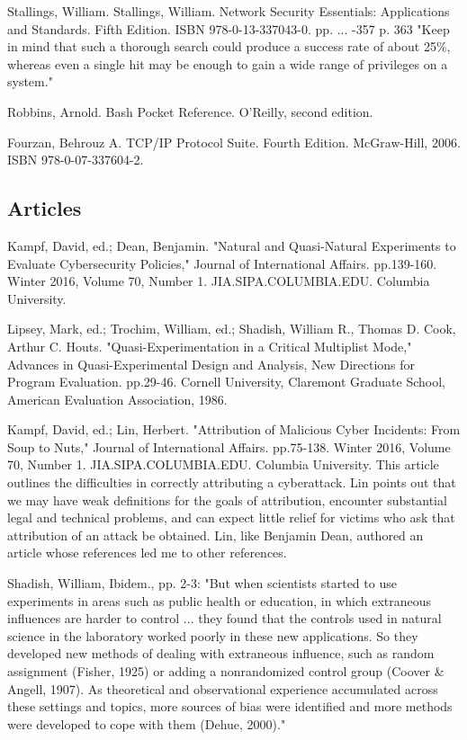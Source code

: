 Stallings, William. Stallings, William. Network Security Essentials: Applications and Standards. Fifth Edition. ISBN 978-0-13-337043-0. pp. ... -357 p. 363 "Keep in mind that such a thorough search could produce a success rate of about 25\%, whereas even a single hit may be enough to gain a wide range of privileges on a system."

Robbins, Arnold. Bash Pocket Reference. O'Reilly, second edition.

Fourzan, Behrouz A. TCP/IP Protocol Suite. Fourth Edition. McGraw-Hill, 2006. ISBN 978-0-07-337604-2.

\subsection{Articles}
Kampf, David, ed.; Dean, Benjamin. "Natural and Quasi-Natural Experiments to Evaluate Cybersecurity Policies," Journal of International Affairs. pp.139-160. Winter 2016, Volume 70, Number 1. JIA.SIPA.COLUMBIA.EDU. Columbia University.

Lipsey, Mark, ed.; Trochim, William, ed.; Shadish, William R., Thomas D. Cook, Arthur C. Houts. "Quasi-Experimentation in a Critical Multiplist Mode," Advances in Quasi-Experimental Design and Analysis, New Directions for Program Evaluation. pp.29-46. Cornell University, Claremont Graduate School, American Evaluation Association, 1986.

Kampf, David, ed.; Lin, Herbert. "Attribution of Malicious Cyber Incidents: From Soup to Nuts," Journal of International Affairs. pp.75-138. Winter 2016, Volume 70, Number 1. JIA.SIPA.COLUMBIA.EDU. Columbia University. This article outlines the difficulties in correctly attributing a cyberattack. Lin points out that we may have weak definitions for the goals of attribution, encounter substantial legal and technical problems, and can expect little relief for victims who ask that attribution of an \gls{attack} be obtained. Lin, like Benjamin Dean, authored an article whose references led me to other references. %

Shadish, William, Ibidem., pp. 2-3: "But when scientists started to use experiments in areas such as public health or education, in which extraneous influences are harder to control ... they found that the controls used in natural science in the laboratory worked poorly in these new applications. So they developed new methods of dealing with extraneous influence, such as random assignment (Fisher, 1925) or adding a nonrandomized control group (Coover \& Angell, 1907). As theoretical and observational experience accumulated across these settings and topics, more sources of bias were identified and more methods were developed to cope with them (Dehue, 2000)."

